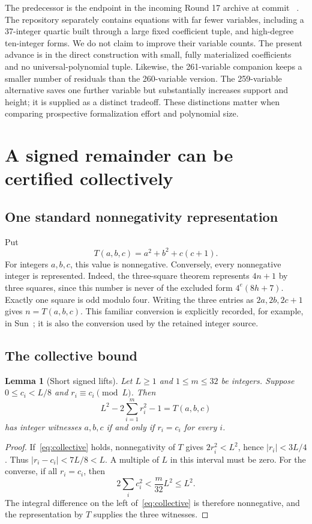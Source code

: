 \documentclass[10pt,letterpaper]{article}
\newtheorem{lemma}[theorem]{Lemma}
\theoremstyle{definition}\newtheorem{definition}[theorem]{Definition}
\begin{document}
The predecessor is the  endpoint in the
incoming Round 17 archive at commit
~\cite{repo,round17}.
The repository separately contains equations with far fewer variables,
including a 37-integer quartic built through a large fixed coefficient
tuple, and high-degree ten-integer forms. We do not claim to improve their
variable counts. The present advance is in the direct construction with
small, fully materialized coefficients and no universal-polynomial tuple.
Likewise, the 261-variable companion keeps a smaller number of residuals
than the 260-variable version. The 259-variable alternative saves one further
variable but substantially increases support and height; it is supplied as
a distinct tradeoff. These distinctions matter when comparing
prospective formalization effort and polynomial size.

\section{A signed remainder can be certified collectively}

\subsection{One standard nonnegativity representation}

Put
\[
 T(a,b,c)=a^2+b^2+c(c+1).
\]
For integers $a,b,c$, this value is nonnegative. Conversely, every
nonnegative integer is represented. Indeed, the three-square theorem
represents $4n+1$ by three squares, since this number is never of the
excluded form $4^e(8h+7)$. Exactly one square is odd modulo four.
Writing the three entries as $2a,2b,2c+1$ gives $n=T(a,b,c)$.
This familiar conversion is explicitly recorded, for example, in
Sun~\cite[eq.~(1.1)]{sun2026}; it is also the conversion used by the
retained integer source.

\subsection{The collective bound}

\begin{lemma}[Short signed lifts]\label{lem:lifts}
Let $L\ge1$ and $1\le m\le32$ be integers. Suppose
$0\le c_i<L/8$ and $r_i\equiv c_i\pmod L$. Then
\begin{equation}\label{eq:collective}
 L^2-2\sum_{i=1}^m r_i^2-1=T(a,b,c)
\end{equation}
has integer witnesses $a,b,c$ if and only if $r_i=c_i$ for every $i$.
\end{lemma}
\begin{proof}
If~\eqref{eq:collective} holds, nonnegativity of $T$ gives
$2r_i^2<L^2$, hence $|r_i|<3L/4$. Thus
$|r_i-c_i|<7L/8<L$. A multiple of $L$ in this interval must be zero.
For the converse, if all $r_i=c_i$, then
\[
 2\sum_i c_i^2<\frac{m}{32}L^2\le L^2.
\]
The integral difference on the left of~\eqref{eq:collective} is therefore
nonnegative, and the representation by $T$ supplies the three witnesses.
\end{proof}
\end{document}
